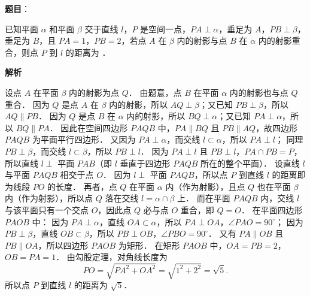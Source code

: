 \begin{answer}

\textbf{题目}：

已知平面 $\alpha$ 和平面 $\beta$ 交于直线 $l$，$P$ 是空间一点，$PA \perp \alpha$，垂足为 $A$，$PB \perp \beta$，垂足为 $B$，且 $PA = 1$，$PB = 2$，若点 $A$ 在 $\beta$ 内的射影与点 $B$ 在 $\alpha$ 内的射影重合，则点 $P$ 到 $l$ 的距离为 \underline{\hspace{3cm}}．

\textbf{解析}

设点 $A$ 在平面 $\beta$ 内的射影为点 $Q$．
由题意，点 $B$ 在平面 $\alpha$ 内的射影也与点 $Q$ 重合．
因为 $Q$ 是点 $A$ 在 $\beta$ 内的射影，所以 $AQ \perp \beta$；又已知 $PB \perp \beta$，所以 $AQ \parallel PB$．
因为 $Q$ 是点 $B$ 在 $\alpha$ 内的射影，所以 $BQ \perp \alpha$；又已知 $PA \perp \alpha$，所以 $BQ \parallel PA$．
因此在空间四边形 $PAQB$ 中，$PA \parallel BQ$ 且 $PB \parallel AQ$，故四边形 $PAQB$ 为平面平行四边形．
又因为 $PA \perp \alpha$，而交线 $l \subset \alpha$，所以 $PA \perp l$；
同理 $PB \perp \beta$，而交线 $l \subset \beta$，所以 $PB \perp l$．
因为 $PA \perp l$ 且 $PB \perp l$，$PA \cap PB = P$，所以直线 $l \perp$ 平面 $PAB$（即 $l$ 垂直于四边形 $PAQB$ 所在的整个平面）．
设直线 $l$ 与平面 $PAQB$ 相交于点 $O$．
因为 $l \perp$ 平面 $PAQB$，所以点 $P$ 到直线 $l$ 的距离即为线段 $PO$ 的长度．
再者，点 $Q$ 在平面 $\alpha$ 内（作为射影），且点 $Q$ 也在平面 $\beta$ 内（作为射影），所以点 $Q$ 落在交线 $l = \alpha \cap \beta$ 上．
而在平面 $PAQB$ 内，交线 $l$ 与该平面只有一个交点 $O$，因此点 $Q$ 必与点 $O$ 重合，即 $Q = O$．
在平面四边形 $PAOB$ 中：
因为 $PA \perp \alpha$，直线 $OA \subset \alpha$，所以 $PA \perp OA$，$\angle PAO = 90^\circ$；
因为 $PB \perp \beta$，直线 $OB \subset \beta$，所以 $PB \perp OB$，$\angle PBO = 90^\circ$．
又有 $PA \parallel OB$ 且 $PB \parallel OA$，所以四边形 $PAOB$ 为矩形．
在矩形 $PAOB$ 中，$OA = PB = 2$，$OB = PA = 1$．
由勾股定理，对角线长度为
\nopagebreak[4]
\[
PO = \sqrt{PA^2 + OA^2} = \sqrt{1^2 + 2^2} = \sqrt{5}.
\]
所以点 $P$ 到直线 $l$ 的距离为 $\sqrt{5}$．


\end{answer}
